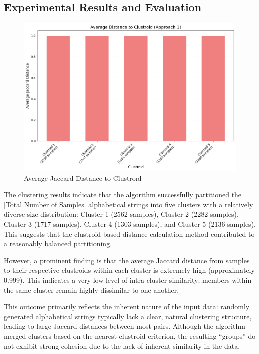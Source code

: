 \subsection{Experimental Results and Evaluation}
\label{subsec:experimental-results-and-evaluation-ahc}

\begin{figure}[H]
    \centering
    \includegraphics[width=0.8\linewidth]{images/clustroid_distance}
    \caption{Average Jaccard Distance to Clustroid}
    \label{fig:clustroid_distance}
\end{figure}

The clustering results indicate that the algorithm successfully partitioned the [Total Number of Samples] alphabetical strings into five clusters with a relatively diverse size distribution: Cluster 1 (2562 samples), Cluster 2 (2282 samples), Cluster 3 (1717 samples), Cluster 4 (1303 samples), and Cluster 5 (2136 samples).
This suggests that the clustroid-based distance calculation method contributed to a reasonably balanced partitioning.

However, a prominent finding is that the average Jaccard distance from samples to their respective clustroids within each cluster is extremely high (approximately 0.999).
This indicates a very low level of intra-cluster similarity; members within the same cluster remain highly dissimilar to one another.

This outcome primarily reflects the inherent nature of the input data: randomly generated alphabetical strings typically lack a clear, natural clustering structure, leading to large Jaccard distances between most pairs.
Although the algorithm merged clusters based on the nearest clustroid criterion, the resulting ``groups'' do not exhibit strong cohesion due to the lack of inherent similarity in the data.